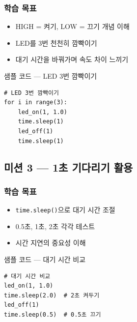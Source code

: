 \begin{storybox}
\end{storybox}

\subsubsection*{학습 목표}
\begin{itemize}[leftmargin=1.4em]
  \item HIGH = 켜기, LOW = 끄기 개념 이해
  \item LED를 3번 천천히 깜빡이기
  \item 대기 시간을 바꿔가며 속도 차이 느끼기
\end{itemize}

\begin{labbox}{샘플 코드 --- LED 3번 깜빡이기}
\begin{verbatim}
# LED 3번 깜빡이기
for i in range(3):
    led_on(1, 1.0)
    time.sleep(1)
    led_off(1)
    time.sleep(1)
\end{verbatim}
\end{labbox}

\subsection{미션 3 --- 1초 기다리기 활용}
\label{subsec:ch02-m3}

\begin{storybox}
\end{storybox}

\subsubsection*{학습 목표}
\begin{itemize}[leftmargin=1.4em]
  \item \texttt{time.sleep()}으로 대기 시간 조절
  \item 0.5초, 1초, 2초 각각 테스트
  \item 시간 지연의 중요성 이해
\end{itemize}

\begin{labbox}{샘플 코드 --- 대기 시간 비교}
\begin{verbatim}
# 대기 시간 비교
led_on(1, 1.0)
time.sleep(2.0)  # 2초 켜두기
led_off(1)
time.sleep(0.5)  # 0.5초 끄기
\end{verbatim}
\end{labbox}

